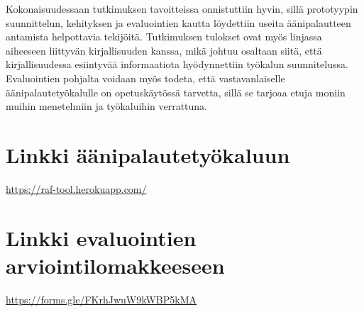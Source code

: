 \documentclass[utf8]{gradu3}
\begin{document}
Kokonaisuudessaan tutkimuksen tavoitteissa onnistuttiin hyvin, sillä prototyypin suunnittelun,  kehityksen ja evaluointien kautta löydettiin useita äänipalautteen antamista helpottavia tekijöitä. Tutkimuksen tulokset ovat myös linjassa aiheeseen liittyvän kirjallisuuden kanssa, mikä johtuu osaltaan siitä, että kirjallisuudessa esiintyvää informaatiota hyödynnettiin työkalun suunnitelussa. Evaluointien pohjalta voidaan myös todeta, että vastavanlaiselle äänipalautetyökalulle on opetuskäytössä tarvetta, sillä se tarjoaa etuja moniin muihin menetelmiin ja työkaluihin verrattuna.

%

\printbibliography

\appendix

\section{Linkki äänipalautetyökaluun}
\label{tool}

\url{https://raf-tool.herokuapp.com/}

\section{Linkki evaluointien arviointilomakkeeseen}
\label{lomake}

\url{https://forms.gle/FKrhJwuW9kWBP5kMA}
\end{document}
